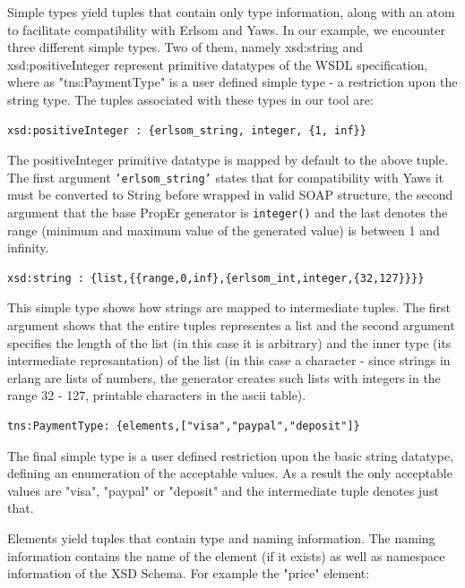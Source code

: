 \documentclass[submission,copyright,a4]{eptcs}
\begin{document}
Simple types yield tuples that contain only type information, along with an atom to facilitate compatibility with Erlsom and Yaws. In our example, we encounter three different simple types. Two of them, namely xsd:string and xsd:positiveInteger represent primitive datatypes of the WSDL specification, where as "tns:PaymentType" is a user defined simple type - a restriction upon the string type. The tuples associated with these types in our tool are:

\begin{lstlisting}
xsd:positiveInteger : {erlsom_string, integer, {1, inf}}
\end{lstlisting}

The positiveInteger primitive datatype is mapped by default to the above tuple. The first argument \texttt{'erlsom\_string'} states that for compatibility with Yaws it must be converted to String before wrapped in valid SOAP structure, the second argument that the base PropEr generator is \texttt{integer()} and the last denotes the range (minimum and maximum value of the generated value) is between 1 and infinity. 

\begin{lstlisting}
xsd:string : {list,{{range,0,inf},{erlsom_int,integer,{32,127}}}}
\end{lstlisting}

This simple type shows how strings are mapped to intermediate tuples. The first argument shows that the entire tuples representes a list and the second argument specifies the length of the list (in this case it is arbitrary) and the inner type (its intermediate represantation) of the list (in this case a character - since strings in erlang are lists of numbers, the generator creates such lists with integers in the range 32 - 127, printable characters in the ascii table).

\begin{lstlisting}
tns:PaymentType: {elements,["visa","paypal","deposit"]}
\end{lstlisting}

The final simple type is a user defined restriction upon the basic string datatype, defining an enumeration of the acceptable values. As a result the only acceptable values are "visa", "paypal" or "deposit" and the intermediate tuple denotes just that.

Elements yield tuples that contain type and naming information. The naming information contains the name of the element (if it exists) as well as namespace information of the XSD Schema. For example the "price" element:
\end{document}
